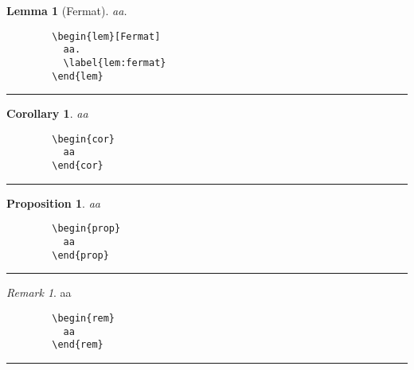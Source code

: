 \documentclass[a4paper,10pt,landscape]{article}
\newcommand{\hSep}{{\color{colorSep}\hrule}}
\newtheorem{cor}[thm]{Corollary}
\newtheorem{lem}[thm]{Lemma}
\newtheorem{prop}[thm]{Proposition}
\theoremstyle{definition}
\theoremstyle{remark}
\newtheorem{rem}{Remark}[section]
\begin{document}
\begin{multicols}{3}
\begin{multicols}{2}
		\begin{lem}[Fermat]
		  aa.
		  \label{lem:fermat}
		\end{lem}
\columnbreak
	\begin{verbatim}
		\begin{lem}[Fermat]
		  aa.
		  \label{lem:fermat}
		\end{lem}
	\end{verbatim}
\end{multicols}
\hSep
\begin{multicols}{2}
		\begin{cor}
		  aa
		\end{cor}
\columnbreak
	\begin{verbatim}
		\begin{cor}
		  aa
		\end{cor}
	\end{verbatim}
\end{multicols}
\hSep
\begin{multicols}{2}
		\begin{prop}
		  aa
		\end{prop}
\columnbreak
	\begin{verbatim}
		\begin{prop}
		  aa
		\end{prop}
	\end{verbatim}
\end{multicols}
\hSep
\begin{multicols}{2}
		\begin{rem}
		  aa
		\end{rem}
\columnbreak
	\begin{verbatim}
		\begin{rem}
		  aa
		\end{rem}
	\end{verbatim}
\end{multicols}
\hSep

\end{multicols}
\end{document}
